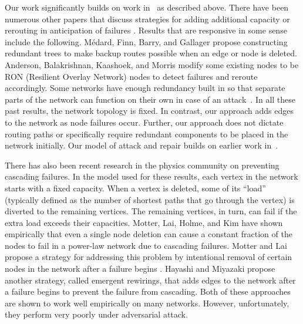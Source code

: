 \documentclass[11pt, letter]{article}
\begin{document}
\medskip
{} 
Our work significantly builds on work in~\cite{HayesPODC08} as described above.  There have been numerous other papers that
discuss strategies for adding additional capacity or rerouting in
anticipation of failures \cite{ doverspike94capacity,
frisanco97capacity, iraschko98capacity, murakami97comparative,
caenegem97capacity, xiong99restore}.  Results that
are responsive in some sense include the following.  M\'{e}dard, Finn, Barry, and Gallager
\cite{medard99redundant} propose constructing redundant trees to make
backup routes possible when an edge or node is deleted.  Anderson,
Balakrishnan, Kaashoek, and Morris \cite{anderson01RON} modify some
existing nodes to be RON (Resilient Overlay Network) nodes to detect
failures and reroute accordingly. Some networks have enough redundancy
built in so that separate parts of the network can function on their
own in case of an attack~\cite{goel04resilient}.  In all these past
results, the network topology is fixed.  In contrast, our approach
adds edges to the network as node failures occur.  Further, our
approach does not dictate routing paths or specifically require
redundant components to be placed in the network initially.   Our model of attack and repair builds on earlier work in~\cite{BomanSAS06, SaiaTrehanIPDPS08}.



There has also been recent research in the physics community on
preventing cascading failures.  In the model used for these results,
each vertex in the network starts with a fixed capacity. When a vertex
is deleted, some of its ``load'' (typically defined as the number of
shortest paths that go through the vertex) is diverted to the
remaining vertices.  The remaining vertices, in turn, can fail if the
extra load exceeds their capacities. Motter, Lai, Holme, and Kim have
shown empirically that even a single node deletion can cause a
constant fraction of the nodes to fail in a power-law network due to
cascading failures\cite{holme-2002-65, motter-2002-66}. Motter and Lai
propose a strategy for addressing this problem by intentional removal
of certain nodes in the network after a failure begins
\cite{motter-2004-93}.  Hayashi and Miyazaki propose another strategy,
called emergent rewirings, that adds edges to the network after a
failure begins to prevent the failure from
cascading\cite{hayashi2005}.  Both of these approaches are
shown to work well empirically on many networks.  However, unfortunately, they
perform very poorly under adversarial attack.
\end{document}
